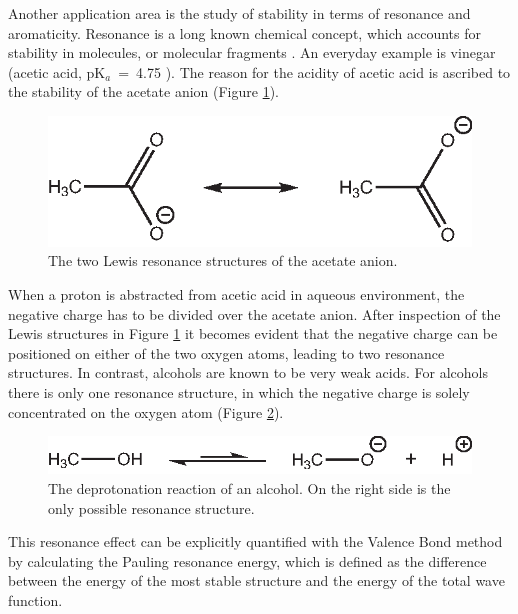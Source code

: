 Another application area is the study of stability in terms of resonance and aromaticity. Resonance is a long known chemical concept, which accounts for stability in molecules, or molecular fragments \cite{whelandbook}. An everyday example is vinegar (acetic acid, pK$_a$~=~4.75 \cite{handbook}). The reason for the acidity of acetic acid is ascribed to the stability of the acetate anion (Figure \ref{ch1.fig.acetic}).
\begin{figure}[htdp]
\center
\includegraphics{introduction/figures/acetic.eps}
\caption{The two Lewis resonance structures of the acetate anion.}
\label{ch1.fig.acetic}
\end{figure}
When a proton is abstracted from acetic acid in aqueous environment, the negative charge has to be divided over the acetate anion. After inspection of the Lewis structures in Figure \ref{ch1.fig.acetic} it becomes evident that the negative charge can be positioned on either of the two oxygen atoms, leading to two resonance structures. In contrast, alcohols are known to be very weak acids. For alcohols there is only one resonance structure, in which the negative charge is solely concentrated on the oxygen atom (Figure \ref{ch1.fig.alcohol}).
\begin{figure}[htdp]
\center
\includegraphics{introduction/figures/alcohol.eps}
\caption{The deprotonation reaction of an alcohol. On the right side is the only possible resonance structure.}
\label{ch1.fig.alcohol}
\end{figure}
This resonance effect can be explicitly quantified with the Valence Bond method by calculating the Pauling resonance energy, which is defined as the difference between the energy of the most stable structure and the energy of the total wave function. 

